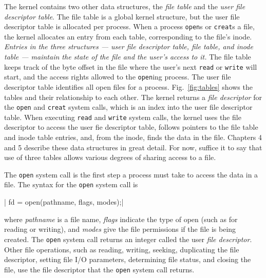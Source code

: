 The kernel contains two other data structures, the \emph{file table} and the \emph{user
  file descriptor table}. The file table is a global kernel structure, but the user file
descriptor table is allocated per process. When a process \texttt{open}s or
\texttt{creat}s a file, the kernel allocates an entry from each table, corresponding to
the file's inode. \emph{Entries in the three structures --- user file descriptor table,
  file table, and inode table --- maintain the state of the file and the user's access to
  it.} The file table keeps track of the byte offset in the file where the user's next
\texttt{read} or \texttt{write} will start, and the access rights allowed to the
\texttt{open}ing process. The user file descriptor table identifies all open files for a
process.  Fig.~\ref{fig:tables} shows the tables and their relationship to each other. The
kernel returns a \emph{file descriptor} for the \texttt{open} and \texttt{creat} system
calls, which is an index into the user file descriptor table. When executing \texttt{read}
and \texttt{write} system calls, the kernel uses the file descriptor to access the user
fie descriptor table, follows pointers to the file table and inode table entries, and,
from the inode, finds the data in the file. Chapters 4 and 5 describe these data
structures in great detail. For now, suffice it to say that use of three tables allows
various degrees of sharing access to a file.

The \texttt{open} system call is the first step a process must take to access the data in
a file. The syntax for the \texttt{open} system call is

|  fd = open(pathname, flags, modes);|

where \emph{pathname} is a file name, \emph{flags} indicate the type of open (such as for
reading or writing), and \emph{modes} give the file permissions if the file is being
created. The \texttt{open} system call returns an integer called the user \emph{file
  descriptor}. Other file operations, such as reading, writing, seeking, duplicating the
file descriptor, setting file I/O parameters, determining file status, and closing the
file, use the file descriptor that the \texttt{open} system call returns.

